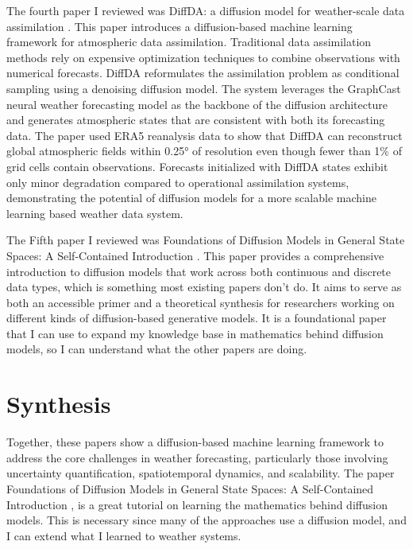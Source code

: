 \documentclass[12pt]{article}
\begin{document}
The fourth paper I reviewed was DiffDA: a diffusion model for weather-scale data assimilation \cite{huang2024diffda}. This paper introduces a diffusion-based machine learning framework for atmospheric data assimilation. Traditional data assimilation methods rely on expensive optimization techniques to combine observations with numerical forecasts. DiffDA reformulates the assimilation problem as conditional sampling using a denoising diffusion model. The system leverages the GraphCast neural weather forecasting model as the backbone of the diffusion architecture and generates atmospheric states that are consistent with both its forecasting data. The paper used ERA5 reanalysis data to show that DiffDA can reconstruct global atmospheric fields within 0.25° of resolution even though fewer than 1\% of grid cells contain observations. Forecasts initialized with DiffDA states exhibit only minor degradation compared to operational assimilation systems, demonstrating the potential of diffusion models for a more scalable machine learning based weather data system.

The Fifth paper I reviewed was Foundations of Diffusion Models in General State Spaces: A Self-Contained Introduction \cite{pauline2025foundations}. This paper provides a comprehensive introduction to diffusion models that work across both continuous and discrete data types, which is something most existing papers don’t do. It aims to serve as both an accessible primer and a theoretical synthesis for researchers working on different kinds of diffusion-based generative models.  It is a foundational paper that I can use to expand my knowledge base in mathematics behind diffusion models, so I can understand what the other papers are doing. 

\section{Synthesis}

Together, these papers show a diffusion-based machine learning framework to address the core challenges in weather forecasting, particularly those involving uncertainty quantification, spatiotemporal dynamics, and scalability. The paper Foundations of Diffusion Models in General State Spaces: A Self-Contained Introduction \cite{pauline2025foundations}, is a great tutorial on learning the mathematics behind diffusion models.  This is necessary since many of the approaches use a diffusion model, and I can extend what I learned to weather systems.
\end{document}

